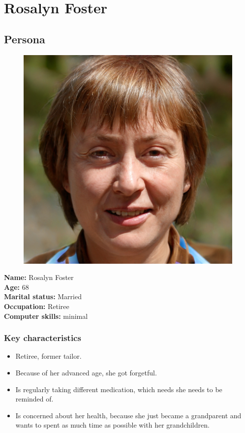 \documentclass[12pt, a4paper, ngerman]{article}
\begin{document}
\section*{Rosalyn Foster}
\subsection*{Persona}

\begin{figure}[htp]
\centering
  \includegraphics[height=0.5\textwidth]{images/persona01.jpg}
\end{figure}
\let\thefootnote\relax{}

\textbf{Name:} Rosalyn Foster \\
\textbf{Age:} 68 \\
\textbf{Marital status:} Married \\
\textbf{Occupation:} Retiree  \\
\textbf{Computer skills:} minimal

\subsubsection*{Key characteristics}

\begin{itemize}[noitemsep]
	\item Retiree, former tailor.
	\item Because of her advanced age, she got forgetful.
	\item Is regularly taking different medication, which needs she needs to be reminded of.
	\item Is concerned about her health, because she just became a grandparent and wants to spent as much time as possible with her grandchildren.
\end{itemize}
\end{document}
